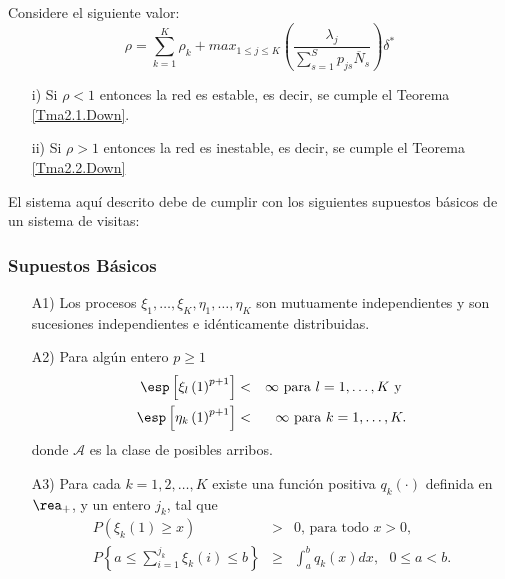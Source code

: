 \begin{Teo}\label{Tma2.3.Down}
Considere el siguiente valor:
\begin{equation}\label{Eq.Rho.1serv}
\rho=\sum_{k=1}^{K}\rho_{k}+max_{1\leq j\leq K}\left(\frac{\lambda_{j}}{\sum_{s=1}^{S}p_{js}\overline{N}_{s}}\right)\delta^{*}
\end{equation}
\begin{itemize}
\item[i)] Si $\rho<1$ entonces la red es estable, es decir, se
cumple el Teorema \ref{Tma2.1.Down}.

\item[ii)] Si $\rho>1$ entonces la red es inestable, es decir, se
cumple el Teorema \ref{Tma2.2.Down}
\end{itemize}
\end{Teo}



El sistema aqu\'i descrito debe de cumplir con los siguientes supuestos b\'asicos de un sistema de visitas:
\subsubsection{Supuestos B\'asicos}
\begin{itemize}
\item[A1)] Los procesos
$\xi_{1},\ldots,\xi_{K},\eta_{1},\ldots,\eta_{K}$ son mutuamente
independientes y son sucesiones independientes e id\'enticamente
distribuidas.

\item[A2)] Para alg\'un entero $p\geq1$
\begin{eqnarray*}
\esp\left[\xi_{l}\left(1\right)^{p+1}\right]&<&\infty\textrm{ para }l=1,\ldots,K\textrm{ y }\\
\esp\left[\eta_{k}\left(1\right)^{p+1}\right]&<&\infty\textrm{
para }k=1,\ldots,K.
\end{eqnarray*}
donde $\mathcal{A}$ es la clase de posibles arribos.

\item[A3)] Para cada $k=1,2,\ldots,K$ existe una funci\'on
positiva $q_{k}\left(\cdot\right)$ definida en $\rea_{+}$, y un
entero $j_{k}$, tal que
\begin{eqnarray}
P\left(\xi_{k}\left(1\right)\geq x\right)&>&0\textrm{, para todo }x>0,\\
P\left\{a\leq\sum_{i=1}^{j_{k}}\xi_{k}\left(i\right)\leq
b\right\}&\geq&\int_{a}^{b}q_{k}\left(x\right)dx, \textrm{ }0\leq
a<b.
\end{eqnarray}
\end{itemize}


